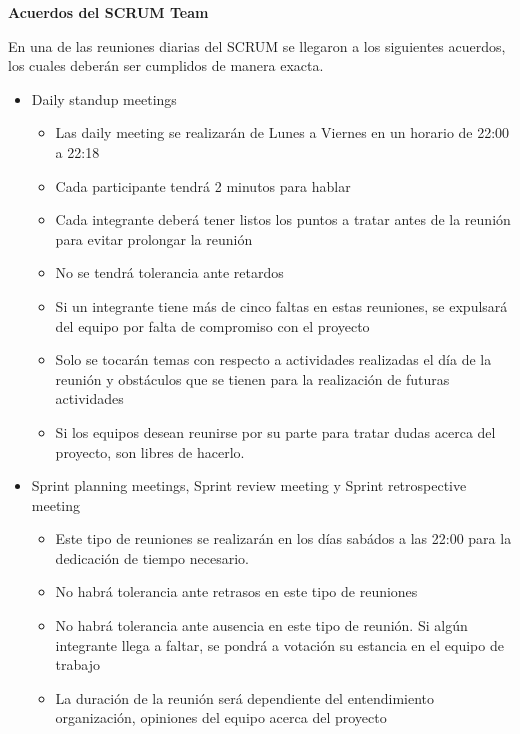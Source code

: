 \documentclass[12pt,letterpaper]{article}
\begin{document}
    \newpage
	\pagestyle{plain}
	{
		\par\vspace{0cm}
		{
			\begin{center}

					\Huge\textbf
					{
						Acuerdos del SCRUM Team
					}
			\end{center}
		}
                \justify
                En una de las reuniones diarias del SCRUM se llegaron a
                los siguientes acuerdos, los cuales deberán ser cumplidos de 
                manera exacta.
                \begin{itemize}
                    \item Daily standup meetings
                    \begin{itemize}
                        \item Las daily meeting se realizarán de Lunes a Viernes en un horario de 22:00 a 22:18 
                        \item Cada participante tendrá 2 minutos para hablar
                        \item Cada integrante deberá tener listos los puntos a tratar antes de la reunión para evitar prolongar la reunión
                        \item No se tendrá tolerancia ante retardos
                        \item Si un integrante tiene más de cinco faltas en estas reuniones, se expulsará del equipo por falta de compromiso con el proyecto
                        \item Solo se tocarán temas con respecto a actividades realizadas el día de la reunión y obstáculos que se tienen para la realización de futuras actividades
                        \item Si los equipos desean reunirse por su parte para tratar dudas acerca del proyecto, son libres de hacerlo.
                    \end{itemize}
                    \item Sprint planning meetings, Sprint review meeting y Sprint retrospective meeting
                    \begin{itemize}
                        \item Este tipo de reuniones se realizarán en los días sabádos a las 22:00 para la dedicación de tiempo necesario.
                        \item No habrá tolerancia ante retrasos en este tipo de reuniones
                        \item No habrá tolerancia ante ausencia en este tipo de reunión. Si algún integrante llega a faltar, se pondrá a votación su estancia en el equipo de trabajo 
                        \item La duración de la reunión será dependiente del entendimiento organización, opiniones del equipo acerca del proyecto 
                    \end{itemize}
                \end{itemize}
    }
    
\end{document}
